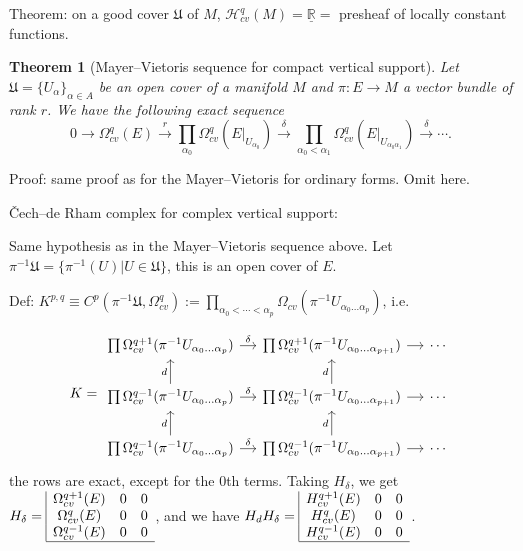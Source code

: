 \documentclass{article}
\theoremstyle{mystyle}
\newtheorem*{theorem*}{Theorem}
\theoremstyle{remark}
\numberwithin{equation}{section}
\begin{document}
Theorem: on a good cover $\mathfrak{U}$ of $M$, 
$\mathcal{H}^q_{cv}(M) = \underline{\mathbb{R}} =$ presheaf of locally constant functions. 


\begin{theorem*}[Mayer--Vietoris sequence for compact vertical support]
Let $\mathfrak{U} = \{U_\alpha\}_{\alpha \in A}$ be an open cover of a manifold $M$ and $\pi\colon E\rightarrow M$ a vector bundle of rank $r$.  We have the following exact sequence
$$0\rightarrow \Omega^q_{cv}(E)\xrightarrow{r}
\prod_{\alpha_0} \Omega^q_{cv}(E|_{U_{\alpha_0}})
\xrightarrow{\delta}\prod_{\alpha_0<\alpha_1}
\Omega^q_{cv}(E|_{U_{\alpha_0\alpha_1}})\xrightarrow{\delta}\cdots.$$
\end{theorem*}

Proof: same proof as for the Mayer--Vietoris for ordinary forms. Omit here.

Čech--de Rham complex for complex vertical support:

Same hypothesis as in the Mayer--Vietoris sequence above.  Let $\pi^{-1}\mathfrak{U} = \{\pi^{-1}(U)|U\in \mathfrak{U}\}$, this is an open cover of $E$. 

Def: $K^{p,q}\equiv C^p(\pi^{-1}\mathfrak{U},\Omega^q_{cv}):=\prod_{\alpha_0<\cdots<\alpha_p}\Omega_{cv}(\pi^{-1}U_{\alpha_0...\alpha_p})$, i.e.

$$K=
\begin{tikzcd}[column sep = small]\prod \Omega_{cv}^{q+1}(\pi^{-1}U_{\alpha_0...\alpha_p})\ar[r,"\delta"] & \prod\Omega_{cv}^{q+1}(\pi^{-1}U_{\alpha_0...\alpha_{p+1}})\ar[r]& \cdots\\
\prod \Omega_{cv}^{q-1}(\pi^{-1}U_{\alpha_0...\alpha_p})\ar[r,"\delta"] \ar[u,"d"]& \prod\Omega_{cv}^{q-1}(\pi^{-1}U_{\alpha_0...\alpha_{p+1}})\ar[u,"d"]\ar[r]&\cdots\\
\prod \Omega_{cv}^{q-1}(\pi^{-1}U_{\alpha_0...\alpha_p})\ar[r,"\delta"]\ar[u,"d"] & \prod\Omega_{cv}^{q-1}(\pi^{-1}U_{\alpha_0...\alpha_{p+1}})\ar[u,"d"]\ar[r]&\cdots
\end{tikzcd}$$
the rows are exact, except for the 0th terms. Taking $H_\delta$, we get
$
H_\delta = \begin{array}{|ccc}
\Omega^{q+1}_{cv}(E) & 0 & 0 \\
\Omega^q_{cv}(E) & 0 & 0 \\
\Omega^{q-1}_{cv}(E) & 0 & 0 \\
\hline
\end{array}
$, 
and we have
$
H_dH_\delta =
\begin{array}{|ccc}
H^{q+1}_{cv}(E) & 0 & 0 \\
H^q_{cv}(E) & 0 & 0 \\
H^{q-1}_{cv}(E) & 0 & 0\\\hline
\end{array}
$.
\end{document}
